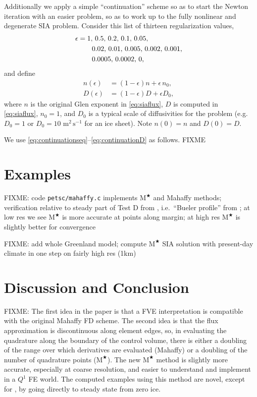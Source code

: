\documentclass[twocolumn,letterpaper]{igs}
\newcommand\eps{\epsilon}
\newcommand{\Mstar}{$\text{M}^{\bigstar}$\xspace}
\begin{document}
Additionally we apply a simple ``continuation'' scheme \citep[compare][]{KelleyKeyes1998} so as to start the Newton iteration with an easier problem, so as to work up to the fully nonlinear and degenerate SIA problem.  Consider this list of thirteen regularization values,
\begin{align}
\eps &= 1,\, 0.5,\, 0.2,\, 0.1,\, 0.05, \label{eq:continuationseq} \\
     &\qquad 0.02,\, 0.01,\, 0.005,\, 0.002,\, 0.001, \notag \\
     &\qquad 0.0005,\, 0.0002,\, 0, \notag
\end{align}
and define
\begin{align}
n(\eps) &= (1-\eps) n + \eps\, n_0,  \label{eq:continuationn} \\
D(\eps) &= (1-\eps) D + \eps D_0,  \label{eq:continuationD}
\end{align}
where $n$ is the original Glen exponent in \eqref{eq:siaflux}, $D$ is computed in \eqref{eq:siaflux}, $n_0=1$, and $D_0$ is a typical scale of diffusivities for the problem (e.g.~$D_0=1$ or $D_0=10$ $\text{m}^2\,\text{s}^{-1}$ for an ice sheet).  Note $n(0)=n$ and $D(0)=D$.

We use \eqref{eq:continuationseq}--\eqref{eq:continuationD} as follows.  FIXME



\section{Examples} \label{sec:examples}

FIXME: code \texttt{petsc/mahaffy.c} implements \Mstar and Mahaffy methods; verification relative to steady part of Test D from \cite{Bueleretal2005}, i.e.~``Bueler profile'' from \cite{vanderVeen2013}; at low res we see \Mstar is more accurate at points along margin; at high res \Mstar is slightly better for convergence

FIXME: add whole Greenland model; compute \Mstar SIA solution with present-day climate in one step on fairly high res (1km)


\section{Discussion and Conclusion} \label{sec:conclusion}

FIXME: The first idea in the paper is that a FVE interpretation is compatible with the original Mahaffy FD scheme.  The second idea is that the flux approximation is discontinuous along element edges, so, in evaluating the quadrature along the boundary of the control volume, there is either a doubling of the range over which derivatives are evaluated (Mahaffy) or a doubling of the number of quadrature points (\Mstar).  The new \Mstar method is slightly more accurate, especially at coarse resolution, and easier to understand and implement in a $Q^1$ FE world.  The computed examples using this method are novel, except for \cite{JouvetBueler2012}, by going directly to steady state from zero ice.
\end{document}
